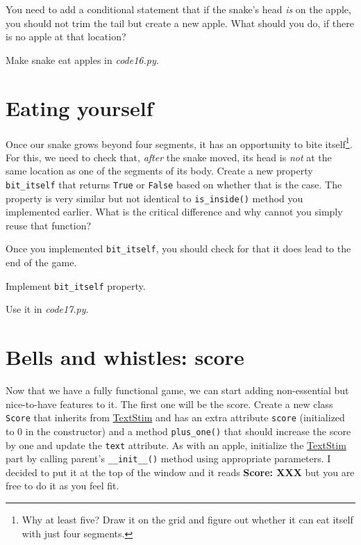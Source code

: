 \documentclass[
]{book}
\begin{document}
You need to add a conditional statement that if the snake's head \emph{is} on the apple, you should not trim the tail but create a new apple. What should you do, if there is no apple at that location?

Make snake eat apples in \emph{code16.py}.

\hypertarget{eating-yourself}{%
\section{Eating yourself}\label{eating-yourself}}

Once our snake grows beyond four segments, it has an opportunity to bite itself\footnote{Why at least five? Draw it on the grid and figure out whether it can eat itself with just four segments.}. For this, we need to check that, \emph{after} the snake moved, its head is \emph{not} at the same location as one of the segments of its body. Create a new property \texttt{bit\_itself} that returns \texttt{True} or \texttt{False} based on whether that is the case. The property is very similar but not identical to \texttt{is\_inside()} method you implemented earlier. What is the critical difference and why cannot you simply reuse that function?

Once you implemented \texttt{bit\_itself}, you should check for that it does lead to the end of the game.

Implement \texttt{bit\_itself} property.

Use it in \emph{code17.py}.

\hypertarget{bells-and-whistles-score}{%
\section{Bells and whistles: score}\label{bells-and-whistles-score}}

Now that we have a fully functional game, we can start adding non-essential but nice-to-have features to it. The first one will be the score. Create a new class \texttt{Score} that inherits from \href{https://psychopy.org/api/visual/textstim.html\#psychopy.visual.TextStim}{TextStim} and has an extra attribute \texttt{score} (initialized to \(0\) in the constructor) and a method \texttt{plus\_one()} that should increase the score by one and update the \texttt{text} attribute. As with an apple, initialize the \href{https://psychopy.org/api/visual/textstim.html\#psychopy.visual.TextStim}{TextStim} part by calling parent's \texttt{\_\_init\_\_()} method using appropriate parameters. I decided to put it at the top of the window and it reads \textbf{Score: XXX} but you are free to do it as you feel fit.
\end{document}
